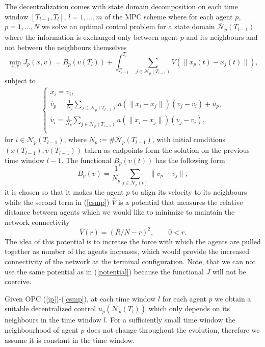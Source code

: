 \documentclass[a4paper,10pt, english]{article}
\newcommand{\D}{\displaystyle}
\begin{document}
 
   The decentralization comes with state domain decomposition on each time window $[T_{l-1}, T_{l}]$, $l = 1, \dots, m$  of the MPC scheme where for each agent $p$, $p = 1, \dots, N$ we solve an optimal control problem for a state domain $\bar{\mathcal{N}}_p(T_{l-1})$ where the information is exchanged only between agent $p$ and its neighbours and not between the neighbours themselves
   \begin{equation}
    \min_{x, v} J_p(x, v) = B_p(v(T_l)) + \int_{T_{l-1}}^{T_l}\sum_{j\in \mathcal{N}_p(T_{l-1})} \bar{V}(\|x_p(t) - x_j(t)\|),
   \label{jp}
   \end{equation}
   subject to 
   \begin{align}
   \begin{cases}
   \D
   \dot{x_i} = v_i,\\
   \dot{v_p} = \frac{1}{N_p}\sum_{j\in \mathcal{N}_p(T_{l-1})}a(\|x_i - x_j\|)(v_j - v_i) + u_p, \\
   \dot{v_i} = \frac{1}{N_p}\sum_{j\in \mathcal{N}_p(T_{l-1})}a(\|x_i - x_j\|)(v_j - v_i),\\
   \end{cases}
   \label{csmp}
   \end{align}
  for $i\in\mathcal{N}_p(T_{l-1})$, where $N_p:= \# \bar{\mathcal{N}}_p(T_{l-1})$, with initial conditions $(x(T_{l-1}), v(T_{l-1}))$ taken as endpoints form the solution on the previous time window $l-1$.
  The functional $B_p(v(t))$ has the following form 
  \begin{equation}
  B_p(v) = \frac{1}{N_p}\sum_{j \in \mathcal{N}_p(t)} \| v_p - v_j \|,
  \label{bp}
  \end{equation}
  it is chosen so that it makes the agent  $p$ to align its velocity to its neighbours while the second term in (\ref{csmp}) $\bar{V}$ is a potential that measures the relative distance between agents which we would like to minimize to maintain the network connectivity
  \begin{equation}
  \bar{V}(r) = (R/N- r)^2, \qquad 0 < r.
  \label{potentialbar}
  \end{equation}
  The idea of this potential is to increase the force with which the agents are pulled together as number of the agents increases, which would provide the increased connectivity of the network at the terminal configuration. Note, that we can not use the same potential as in (\ref{potential}) because the functional $J$ will not be coercive.
  
 Given OPC (\ref{jp})-(\ref{csmp}), at each time window $l$ for each agent $p$ we obtain a suitable decentralized control $u_p(\mathcal{N}_p(T_l))$ which only depends on its neighbours in the time window $l$.
 For a sufficiently small time window the  neighbourhood of agent $p$ does not change throughout the evolution, therefore we assume it is constant in the time window. 
\end{document}
